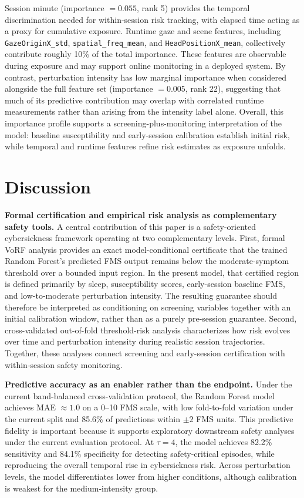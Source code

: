 \documentclass[review]{vgtc}              %
\begin{document}
Session minute (importance $= 0.055$, rank 5) provides the temporal discrimination needed for within-session risk tracking, with elapsed time acting as a proxy for cumulative exposure. Runtime gaze and scene features, including \texttt{GazeOriginX\_std}, \texttt{spatial\_freq\_mean}, and \texttt{HeadPositionX\_mean}, collectively contribute roughly 10\% of the total importance. These features are observable during exposure and may support online monitoring in a deployed system. By contrast, perturbation intensity has low marginal importance when considered alongside the full feature set (importance $= 0.005$, rank 22), suggesting that much of its predictive contribution may overlap with correlated runtime measurements rather than arising from the intensity label alone. Overall, this importance profile supports a screening-plus-monitoring interpretation of the model: baseline susceptibility and early-session calibration establish initial risk, while temporal and runtime features refine risk estimates as exposure unfolds.

\section{Discussion}\label{sec:discussion}

\textbf{Formal certification and empirical risk analysis as complementary safety tools.}
A central contribution of this paper is a safety-oriented cybersickness framework operating at two complementary levels. First, formal VoRF analysis provides an exact model-conditional certificate that the trained Random Forest's predicted FMS output remains below the moderate-symptom threshold over a bounded input region. In the present model, that certified region is defined primarily by sleep, susceptibility scores, early-session baseline FMS, and low-to-moderate perturbation intensity. The resulting guarantee should therefore be interpreted as conditioning on screening variables together with an initial calibration window, rather than as a purely pre-session guarantee. Second, cross-validated out-of-fold threshold-risk analysis characterizes how risk evolves over time and perturbation intensity during realistic session trajectories. Together, these analyses connect screening and early-session certification with within-session safety monitoring.

\textbf{Predictive accuracy as an enabler rather than the endpoint.}
Under the current band-balanced cross-validation protocol, the Random Forest model achieves MAE $\approx 1.0$ on a 0--10 FMS scale, with low fold-to-fold variation under the current split and 85.6\% of predictions within $\pm 2$ FMS units. This predictive fidelity is important because it supports exploratory downstream safety analyses under the current evaluation protocol. At $\tau = 4$, the model achieves 82.2\% sensitivity and 84.1\% specificity for detecting safety-critical episodes, while reproducing the overall temporal rise in cybersickness risk. Across perturbation levels, the model differentiates lower from higher conditions, although calibration is weakest for the medium-intensity group.
\end{document}
